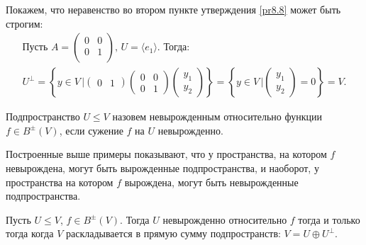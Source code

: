 \begin{example} 
    Покажем, что неравенство во втором пункте утверждения \ref{pr8.8} может быть строгим:
    \begin{multline*}
        \text{Пусть } A = \begin{pmatrix}
            0      & 0   \\
            0      & 1   \\
        \end{pmatrix} \text{, } U = \langle e_1 \rangle. \text{ Тогда: } \\ 
        U^{\perp} = \left\{ y \in V \,\Big\vert \begin{pmatrix}
            0  & 1
        \end{pmatrix} \begin{pmatrix}
            0  & 0   \\
            0  & 1 
        \end{pmatrix} \begin{pmatrix}
            y_1   \\
            y_2  
        \end{pmatrix} \right\} = \left\{ y \in V \,\Big\vert \begin{pmatrix}
                y_1   \\
                y_2  
            \end{pmatrix} = 0 \right\} = V.
    \end{multline*}
\end{example}

\begin{definition}
    Подпространство $U \leq V$ назовем невырожденным относительно функции $f \in B^{\pm}(V)$, если 
    сужение $f$ на $U$ невырожденно.
\end{definition}

\begin{note}
    Построенные выше примеры показывают, что у пространства, на котором $f$ невырождена, могут быть 
    вырожденные подпространства, и наоборот, у пространства на котором $f$ вырождена, могут 
    быть невырожденные подпространства.
\end{note}

\begin{theorem}
    \label{th8.1}
    Пусть $U \leq V$, $f \in B^{\pm}(V)$. Тогда $U$ невырожденно относительно $f$ тогда и только 
    тогда когда $V$ раскладывается в прямую сумму подпространств: $V = U \oplus U^{\perp}$.
\end{theorem}

